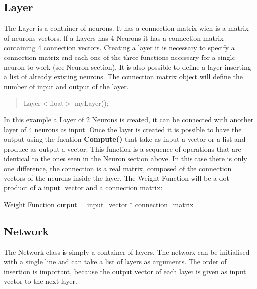 \subsection*{Layer }

The Layer is a container of neurons. It has a connection matrix wich is a matrix of neurons vectors. If a Layers has 4 Neurons it has a connection matrix containing 4 connection vectors. Creating a layer it is necessary to specify a connection matrix and each one of the three functions necessary for a single neuron to work (see Neuron section). It is also possible to define a layer inserting a list of already existing neurons. The connection matrix object will define the number of input and output of the layer.

\begin{quotation}


Layer$<$float$>$ my\-Layer();

\end{quotation}


In this example a Layer of 2 Neurons is created, it can be connected with another layer of 4 neurons as input. Once the layer is created it is possible to have the output using the fucntion {\bfseries Compute()} that take as input a vector or a list and produce as output a vector. This function is a sequence of operations that are identical to the ones seen in the Neuron section above. In this case there is only one difference, the connection is a real matrix, composed of the connection vectors of the neurons inside the layer. The Weight Function will be a dot product of a input\-\_\-vector and a connection matrix\-:


\begin{DoxyItemize}
\item Weight Function output = input\-\_\-vector $\ast$ connection\-\_\-matrix
\end{DoxyItemize}

\subsection*{Network }

The Network class is simply a container of layers. The network can be initialised with a single line and can take a list of layers as arguments. The order of insertion is important, because the output vector of each layer is given as input vector to the next layer. 